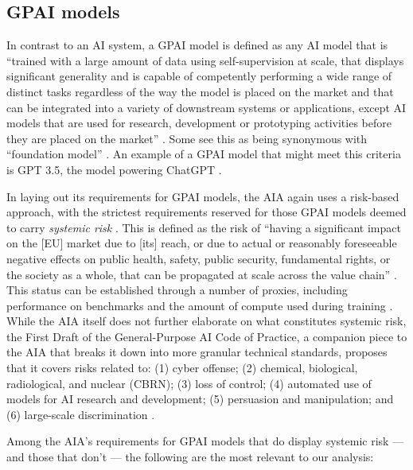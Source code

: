 \subsection{GPAI models}

In contrast to an AI system, a GPAI model is defined as any AI model that is ``trained with a large amount of data using self-supervision at scale, that displays significant generality and is capable of competently performing a wide range of distinct tasks regardless of the way the model is placed on the market and that can be integrated into a variety of downstream systems or applications, except AI models that are used for research, development or prototyping activities before they are placed on the market'' \citep[Art. 3.63]{european_union_ai_act_2024}. Some see this as being synonymous with ``foundation model'' \citep{ada_lovelace_foundation_models_2024}. An example of a GPAI model that might meet this criteria is GPT 3.5, the model powering ChatGPT \citep{fernandez-llorca_interdisciplinary_2024}.

In laying out its requirements for GPAI models, the AIA again uses a risk-based approach, with the strictest requirements reserved for those GPAI models deemed to carry \textit{systemic risk} \citep[Art. 55]{european_union_ai_act_2024}. This is defined as the risk of ``having a significant impact on the [EU] market due to [its] reach, or due to actual or reasonably foreseeable negative effects on public health, safety, public security, fundamental rights, or the society as a whole, that can be propagated at scale across the value chain'' \citep[Art. 2.65; Annex III]{european_union_ai_act_2024}. This status can be established through a number of proxies, including performance on benchmarks and the amount of compute used during training \citep[Art. 51]{european_union_ai_act_2024}. While the AIA itself does not further elaborate on what constitutes systemic risk, the First Draft of the General-Purpose AI Code of Practice, a companion piece to the AIA that breaks it down into more granular technical standards, proposes that it covers risks related to: (1) cyber offense; (2) chemical, biological, radiological, and nuclear (CBRN); (3) loss of control; (4) automated use of models for AI research and development; (5) persuasion and manipulation; and (6) large-scale discrimination \cite{gpai_code_2024}.

Among the AIA's requirements for GPAI models that do display systemic risk --- and those that don't --- the following are the most relevant to our analysis: 

